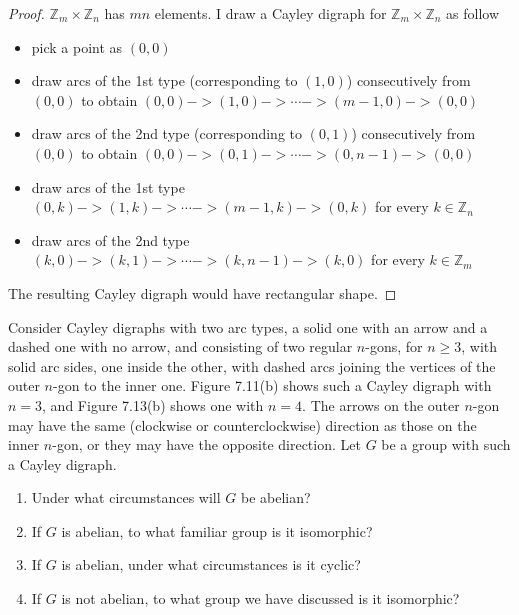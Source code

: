 \begin{proof}
    $\mathbb{Z}_{m}\times\mathbb{Z}_{n}$ has $mn$ elements. I draw a Cayley digraph for $\mathbb{Z}_{m}\times\mathbb{Z}_{n}$ as follow
    \begin{itemize}
        \item pick a point as $(0,0)$
        \item draw arcs of the 1st type (corresponding to $(1,0)$) consecutively from $(0,0)$ to obtain $(0,0) -> (1,0) -> \cdots -> (m-1,0) -> (0,0)$
        \item draw arcs of the 2nd type (corresponding to $(0,1)$) consecutively from $(0,0)$ to obtain $(0,0) -> (0,1) -> \cdots -> (0,n-1) -> (0,0)$
        \item draw arcs of the 1st type $(0,k) -> (1,k) -> \cdots -> (m-1,k) -> (0,k)$ for every $k\in\mathbb{Z}_{n}$
        \item draw arcs of the 2nd type $(k,0) -> (k,1) -> \cdots -> (k,n-1) -> (k,0)$ for every $k\in\mathbb{Z}_{m}$
    \end{itemize}

    The resulting Cayley digraph would have rectangular shape.
\end{proof}

\begin{exercise}
    Consider Cayley digraphs with two arc types, a solid one with an arrow and a dashed one with no arrow, and consisting of two regular $n$-gons, for $n\geq 3$, with solid arc sides, one inside the other, with dashed arcs joining the vertices of the outer $n$-gon to the inner one. Figure 7.11(b) shows such a Cayley digraph with $n = 3$, and Figure 7.13(b) shows one with $n = 4$. The arrows on the outer $n$-gon may have the same (clockwise or counterclockwise) direction as those on the inner $n$-gon, or they may have the opposite direction. Let $G$ be a group with such a Cayley digraph.
    \begin{enumerate}[label={\textbf{\alph*.}}]
        \item Under what circumstances will $G$ be abelian?
        \item If $G$ is abelian, to what familiar group is it isomorphic?
        \item If $G$ is abelian, under what circumstances is it cyclic?
        \item If $G$ is not abelian, to what group we have discussed is it isomorphic?
    \end{enumerate}
\end{exercise}

